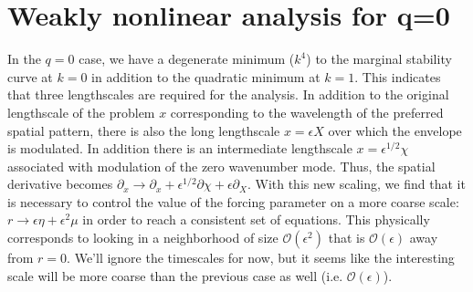 \documentclass[../main/WavelengthCompetition.tex]{subfiles}
\begin{document}
\section{Weakly nonlinear analysis for q=0}
In the $q=0$ case, we have a degenerate minimum ($k^4$) to the marginal stability curve at $k=0$ in addition to the quadratic minimum at $k=1$.  This indicates that three lengthscales are required for the analysis.  In addition to the original lengthscale of the problem $x$ corresponding to the wavelength of the preferred spatial pattern, there is also the long lengthscale $x=\epsilon X$ over which the envelope is modulated.  In addition there is an intermediate lengthscale $x=\epsilon^{1/2} \chi$ associated with modulation of the zero wavenumber mode.  Thus, the spatial derivative becomes $\partial_x\rightarrow \partial_x+ \epsilon^{1/2}\partial{\chi}+\epsilon\partial_{X}$.  With this new scaling, we find that it is necessary to control the value of the forcing parameter on a more coarse scale: $r\rightarrow \epsilon \eta +\epsilon^2\mu$ in order to reach a consistent set of equations.  This physically corresponds to looking in a neighborhood of size $\mathcal{O}(\epsilon^2)$ that is $\mathcal{O}(\epsilon)$ away from $r=0$. We'll ignore the timescales for now, but it seems like the interesting scale will be more coarse than the previous case as well (i.e. $\mathcal{O}(\epsilon)$).  
\end{document}
